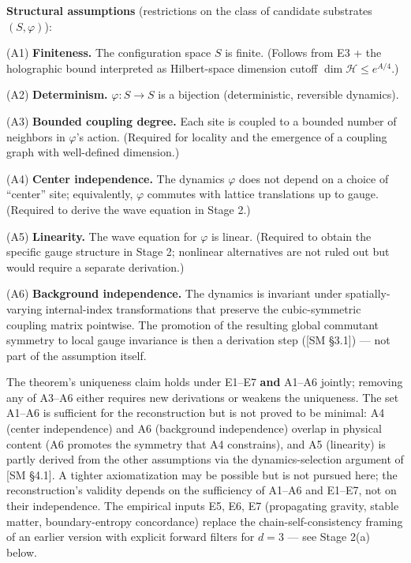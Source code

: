 \documentclass[
]{article}
\begin{document}
\textbf{Structural assumptions} (restrictions on the class of candidate
substrates \((S, \varphi)\)):

(A1) \textbf{Finiteness.} The configuration space \(S\) is finite.
(Follows from E3 + the holographic bound interpreted as Hilbert-space
dimension cutoff \(\dim \mathcal{H} \leq e^{A/4}\).)

(A2) \textbf{Determinism.} \(\varphi: S \to S\) is a bijection
(deterministic, reversible dynamics).

(A3) \textbf{Bounded coupling degree.} Each site is coupled to a bounded
number of neighbors in \(\varphi\)'s action. (Required for locality and
the emergence of a coupling graph with well-defined dimension.)

(A4) \textbf{Center independence.} The dynamics \(\varphi\) does not
depend on a choice of ``center'' site; equivalently, \(\varphi\)
commutes with lattice translations up to gauge. (Required to derive the
wave equation in Stage 2.)

(A5) \textbf{Linearity.} The wave equation for \(\varphi\) is linear.
(Required to obtain the specific gauge structure in Stage 2; nonlinear
alternatives are not ruled out but would require a separate derivation.)

(A6) \textbf{Background independence.} The dynamics is invariant under
spatially-varying internal-index transformations that preserve the
cubic-symmetric coupling matrix pointwise. The promotion of the
resulting global commutant symmetry to local gauge invariance is then a
derivation step ({[}SM §3.1{]}) --- not part of the assumption itself.

The theorem's uniqueness claim holds under E1--E7 \textbf{and} A1--A6
jointly; removing any of A3--A6 either requires new derivations or
weakens the uniqueness. The set A1--A6 is sufficient for the
reconstruction but is not proved to be minimal: A4 (center independence)
and A6 (background independence) overlap in physical content (A6
promotes the symmetry that A4 constrains), and A5 (linearity) is partly
derived from the other assumptions via the dynamics-selection argument
of {[}SM §4.1{]}. A tighter axiomatization may be possible but is not
pursued here; the reconstruction's validity depends on the sufficiency
of A1--A6 and E1--E7, not on their independence. The empirical inputs
E5, E6, E7 (propagating gravity, stable matter, boundary-entropy
concordance) replace the chain-self-consistency framing of an earlier
version with explicit forward filters for \(d = 3\) --- see Stage 2(a)
below.
\end{document}
